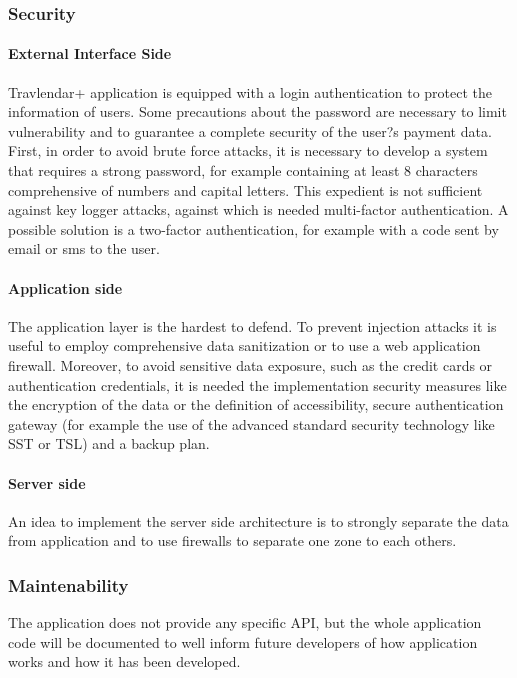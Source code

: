 \documentclass[12pt,titlepage]{article}
\begin{document}
\subsubsection{Security}\label{sec:mod1}
\paragraph{External Interface Side} 
Travlendar+ application is equipped with a login authentication to protect the information of users. Some precautions about the password are necessary to limit vulnerability and to guarantee a complete security of the user?s payment data. First, in order to avoid brute force attacks, it is necessary to develop a system that requires a strong password, for example containing at least 8 characters comprehensive of numbers and capital letters. This expedient is not sufficient against key logger attacks, against which is needed multi-factor authentication. A possible solution is a two-factor authentication, for example with a code sent by email or sms to the user. 

\paragraph{Application side}
The application layer is the hardest to defend. To prevent injection attacks it is useful to employ comprehensive data sanitization or to use a web application firewall. Moreover, to avoid sensitive data exposure, such as the credit cards or authentication credentials, it is needed the implementation security measures like the encryption of the data or the definition of accessibility, secure authentication gateway (for example the use of the advanced standard security technology like SST or TSL) and a backup plan.

\paragraph{Server side}
An idea to implement the server side architecture is to strongly separate the data from application and to use firewalls to separate one zone to each others. 


\subsubsection{Maintenability}\label{sec:mod1}
The application does not provide any specific API, but the whole application code will be documented to well inform future developers of how application works and how it has been developed. 
\end{document}

